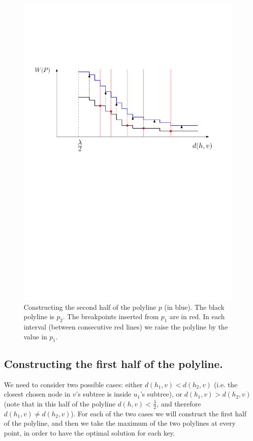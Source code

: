 \documentclass[a4paper,UKenglish]{lipics-v2016}
\theoremstyle{plain}
\begin{document}
\begin{figure}[h]
\begin{center}
\includegraphics[scale=.55]{new_polyline_second_half}
\end{center}
\caption{Constructing the second half of the polyline $p$ (in blue). The black polyline is $p_2$. The breakpoints inserted from $p_1$ are in red. In each interval (between consecutive red lines) we raise the polyline by the value in $p_1$.
\label{figure of constructing the second half of the polyline}}
\end{figure}

\subsection{Constructing the first half of the polyline.} We need to consider two possible cases: either $d(h_1,v) < d(h_2,v)$ (i.e. the closest chosen node in $v$'s subtree is inside $u_1$'s subtree), or $d(h_1,v) > d(h_2,v)$ (note that in this half of the polyline $d(h,v)<\frac{\lambda}{2}$, and therefore $d(h_1,v) \neq d(h_2,v)$). For each of the two cases we will construct the first half of the polyline, and then we take the maximum of the two polylines at every point, in order to have the optimal solution for each key.
\end{document}

